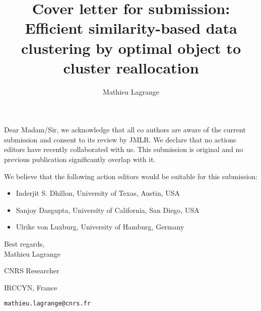 \documentclass[10pt]{article}
\title{Cover letter for submission: \\
Efficient similarity-based data clustering by optimal object to cluster reallocation}
\author{Mathieu Lagrange}
\begin{document}
\maketitle

Dear Madam/Sir, we acknowledge that all co authors are aware of the current submission and consent to its review by JMLR. We declare that no actions editors have recently collaborated with us. This submission is original and no previous publication significantly overlap with it.

We believe that the following action editors would be suitable for this submission:
\begin{itemize}
\item Inderjit S. Dhillon, University of Texas, Austin, USA
\item Sanjoy Dasgupta, University of California, San Diego, USA
\item Ulrike von Luxburg, University of Hamburg, Germany
\end{itemize}

Best regards,\\

Mathieu Lagrange

CNRS Researcher 

IRCCYN, France

\texttt{mathieu.lagrange@cnrs.fr}
\end{document}
